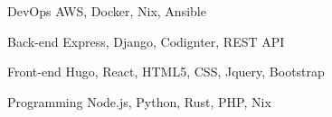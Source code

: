 

\begin{cvskills}

  \cvskill
    {DevOps} %
    {AWS, Docker, Nix, Ansible} %

  \cvskill
    {Back-end} %
    {Express, Django, Codignter, REST API} %

  \cvskill
    {Front-end} %
    {Hugo, React, HTML5, CSS, Jquery, Bootstrap} %

  \cvskill
    {Programming} %
    {Node.js, Python, Rust, PHP, Nix} %

\end{cvskills}

